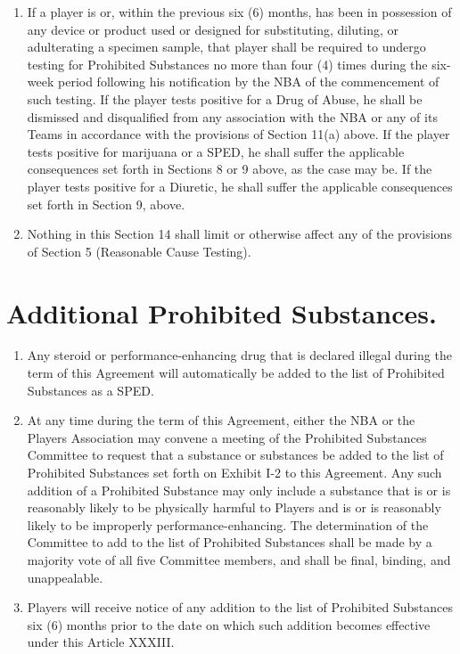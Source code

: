 \documentclass[
]{book}
\providecommand{\tightlist}{%
  \setlength{\itemsep}{0pt}\setlength{\parskip}{0pt}}
\begin{document}
\begin{enumerate}
\item
  If a player is or, within the previous six (6) months, has been in possession of any device or product used or designed for substituting, diluting, or adulterating a specimen sample, that player shall be required to undergo testing for Prohibited Substances no more than four (4) times during the six-week period following his notification by the NBA of the commencement of such testing. If the player tests positive for a Drug of Abuse, he shall be dismissed and disqualified from any association with the NBA or any of its Teams in accordance with the provisions of Section 11(a) above. If the player tests positive for marijuana or a SPED, he shall suffer the applicable consequences set forth in Sections 8 or 9 above, as the case may be. If the player tests positive for a Diuretic, he shall suffer the applicable consequences set forth in Section 9, above.
\item
  Nothing in this Section 14 shall limit or otherwise affect any of the provisions of Section 5 (Reasonable Cause Testing).
\end{enumerate}

\hypertarget{additional-prohibited-substances.}{%
\section{Additional Prohibited Substances.}\label{additional-prohibited-substances.}}

\begin{enumerate}
\def\labelenumi{(\alph{enumi})}
\tightlist
\item
  Any steroid or performance-enhancing drug that is declared illegal during the term of this Agreement will automatically be added to the list of Prohibited Substances as a SPED.
\item
  At any time during the term of this Agreement, either the NBA or the Players Association may convene a meeting of the Prohibited Substances Committee to request that a substance or substances be added to the list of Prohibited Substances set forth on Exhibit I-2 to this Agreement. Any such addition of a Prohibited Substance may only include a substance that is or is reasonably likely to be physically harmful to Players and is or is reasonably likely to be improperly performance-enhancing. The determination of the Committee to add to the list of Prohibited Substances shall be made by a majority vote of all five Committee members, and shall be final, binding, and unappealable.
\item
  Players will receive notice of any addition to the list of Prohibited Substances six (6) months prior to the date on which such addition becomes effective under this Article XXXIII.
\end{enumerate}
\end{document}
